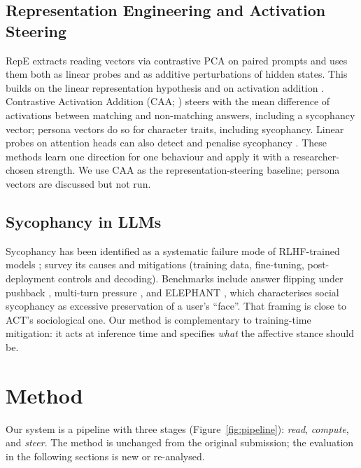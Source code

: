 \documentclass[letterpaper]{article} %
\begin{document}
\subsection{Representation Engineering and Activation Steering}

RepE \citep{zou2023representation} extracts reading vectors via contrastive PCA on paired prompts and uses them both as linear probes and as additive perturbations of hidden states. This builds on the linear representation hypothesis \citep{mikolov2013linguistic, marks2024linear, park2024linear} and on activation addition \citep{turner2023activation, li2024inference}. Contrastive Activation Addition (CAA; \citealt{rimsky2024steering}) steers with the mean difference of activations between matching and non-matching answers, including a sycophancy vector; persona vectors \citep{chen2025persona} do so for character traits, including sycophancy. Linear probes on attention heads can also detect and penalise sycophancy \citep{genadi2026hides, papadatos2024probe}. These methods learn one direction for one behaviour and apply it with a researcher-chosen strength. We use CAA as the representation-steering baseline; persona vectors are discussed but not run.

\subsection{Sycophancy in LLMs}

Sycophancy has been identified as a systematic failure mode of RLHF-trained models \citep{sharma2024understanding, perez2023discovering}; \citet{malmqvist2024sycophancy} survey its causes and mitigations (training data, fine-tuning, post-deployment controls and decoding). Benchmarks include answer flipping under pushback \citep{sharma2024understanding}, multi-turn pressure \citep{hong2025sycon}, and ELEPHANT \citep{cheng2025elephant}, which characterises social sycophancy as excessive preservation of a user's ``face''. That framing is close to ACT's sociological one. Our method is complementary to training-time mitigation: it acts at inference time and specifies \textit{what} the affective stance should be.

\section{Method}

Our system is a pipeline with three stages (Figure~\ref{fig:pipeline}): \textit{read}, \textit{compute}, and \textit{steer}. The method is unchanged from the original submission; the evaluation in the following sections is new or re-analysed.
\end{document}
